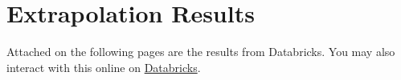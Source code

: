 \section{Extrapolation Results}
\label{app:results}

Attached on the following pages are the results from Databricks. You may also interact with this online on \href{\databricksurl}{Databricks}.


